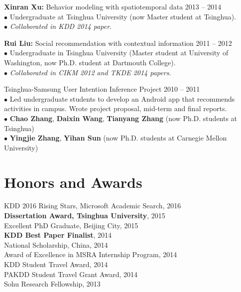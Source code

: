 \documentclass[margin, 10pt]{res}
\begin{document}
\begin{resume}
{\textbf{Xinran Xu:} Behavior modeling with spatiotemporal data} \hfill{2013 -- 2014} \\
$\bullet$ Undergraduate at Tsinghua University (now Master student at Tsinghua). \\
$\bullet$ \textit{Collaborated in KDD 2014 paper}.

{\textbf{Rui Liu:} Social recommendation with contextual information} \hfill{2011 -- 2012} \\
$\bullet$ Undergraduate in Tsinghua University (Master student at University of Washington, now Ph.D. student at Dartmouth College). \\
$\bullet$ \textit{Collaborated in CIKM 2012 and TKDE 2014 papers}.

Tsinghua-Samsung User Intention Inference Project \hfill{2010 -- 2011} \\
$\bullet$ Led undergraduate students to develop an Android app that recommends activities in campus. Wrote project proposal, mid-term and final reports. \\
$\bullet$ \textbf{Chao Zhang}, \textbf{Daixin Wang}, \textbf{Tianyang Zhang} (now Ph.D. students at Tsinghua) \\
$\bullet$ \textbf{Yingjie Zhang}, \textbf{Yihan Sun} (now Ph.D. students at Carnegie Mellon University)


\section{Honors and Awards}

KDD 2016 Rising Stars, Microsoft Academic Search, 2016 \\
\textbf{Dissertation Award, Tsinghua University}, 2015 \\
{Excellent PhD Graduate, Beijing City}, 2015 \\
\textbf{KDD Best Paper Finalist}, 2014 \\
{National Scholarship, China}, 2014 \\
{Award of Excellence in MSRA Internship Program}, 2014 \\
{KDD Student Travel Award}, 2014 \\
{PAKDD Student Travel Grant Award}, 2014 \\
{Sohu Research Fellowship}, 2013


\end{resume}
\end{document}

